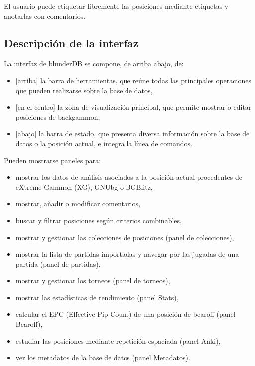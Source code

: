 \documentclass[letterpaper,10pt,spanish]{sphinxmanual}
\begin{document}
\sphinxAtStartPar
El usuario puede etiquetar libremente las posiciones mediante etiquetas y anotarlas con comentarios.


\subsection{Descripción de la interfaz}
\label{\detokenize{manuel:description-de-l-interface}}
\sphinxAtStartPar
La interfaz de blunderDB se compone, de arriba abajo, de:
\begin{itemize}
\item {} 
\sphinxAtStartPar
{[}arriba{]} la barra de herramientas, que reúne todas las principales operaciones que pueden realizarse sobre la base de datos,

\item {} 
\sphinxAtStartPar
{[}en el centro{]} la zona de visualización principal, que permite mostrar o editar posiciones de backgammon,

\item {} 
\sphinxAtStartPar
{[}abajo{]} la barra de estado, que presenta diversa información sobre la base de datos o la posición actual, e integra la línea de comandos.

\end{itemize}

\sphinxAtStartPar
Pueden mostrarse paneles para:
\begin{itemize}
\item {} 
\sphinxAtStartPar
mostrar los datos de análisis asociados a la posición actual procedentes de eXtreme Gammon (XG), GNUbg o BGBlitz,

\item {} 
\sphinxAtStartPar
mostrar, añadir o modificar comentarios,

\item {} 
\sphinxAtStartPar
buscar y filtrar posiciones según criterios combinables,

\item {} 
\sphinxAtStartPar
mostrar y gestionar las colecciones de posiciones (panel de colecciones),

\item {} 
\sphinxAtStartPar
mostrar la lista de partidas importadas y navegar por las jugadas de una partida (panel de partidas),

\item {} 
\sphinxAtStartPar
mostrar y gestionar los torneos (panel de torneos),

\item {} 
\sphinxAtStartPar
mostrar las estadísticas de rendimiento (panel Stats),

\item {} 
\sphinxAtStartPar
calcular el EPC (Effective Pip Count) de una posición de bearoff (panel Bearoff),

\item {} 
\sphinxAtStartPar
estudiar las posiciones mediante repetición espaciada (panel Anki),

\item {} 
\sphinxAtStartPar
ver los metadatos de la base de datos (panel Metadatos).

\end{itemize}
\end{document}

